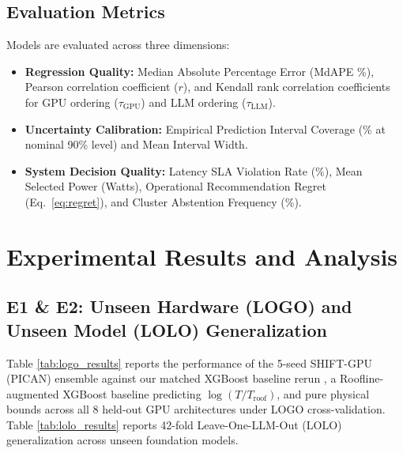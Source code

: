 \documentclass[preprint,12pt]{elsarticle}
\begin{document}
\subsection{Evaluation Metrics}
Models are evaluated across three dimensions:
\begin{itemize}
    \item \textbf{Regression Quality:} Median Absolute Percentage Error (MdAPE \%), Pearson correlation coefficient ($r$), and Kendall rank correlation coefficients for GPU ordering ($\tau_{\text{GPU}}$) and LLM ordering ($\tau_{\text{LLM}}$).
    \item \textbf{Uncertainty Calibration:} Empirical Prediction Interval Coverage (\% at nominal 90\% level) and Mean Interval Width.
    \item \textbf{System Decision Quality:} Latency SLA Violation Rate (\%), Mean Selected Power (Watts), Operational Recommendation Regret (Eq.~\eqref{eq:regret}), and Cluster Abstention Frequency (\%).
\end{itemize}

\section{Experimental Results and Analysis}
\label{sec:results}

\subsection{E1 \& E2: Unseen Hardware (LOGO) and Unseen Model (LOLO) Generalization}
Table \ref{tab:logo_results} reports the performance of the 5-seed SHIFT-GPU (PICAN) ensemble against our matched XGBoost baseline rerun \citep{fadel2026wattgpu}, a Roofline-augmented XGBoost baseline predicting $\log(T / T_{\text{roof}})$, and pure physical bounds across all 8 held-out GPU architectures under LOGO cross-validation. Table \ref{tab:lolo_results} reports 42-fold Leave-One-LLM-Out (LOLO) generalization across unseen foundation models.
\end{document}
